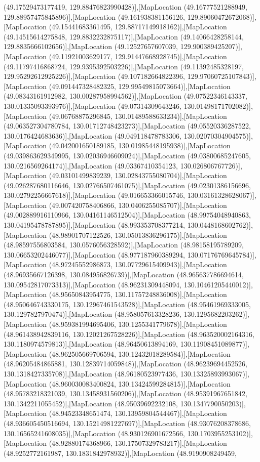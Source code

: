 (49.17529473177419, 129.88476823990428)],[MapLocation (49.16777521288949, 129.88957475845896)],[MapLocation (49.161938381156126, 129.89060472672068)],[MapLocation (49.15441683361495, 129.88717149918162)],[MapLocation (49.14515614275848, 129.8832232875117)],[MapLocation (49.14066428258144, 129.8835666102656)],[MapLocation (49.12527657607039, 129.900389425207)],[MapLocation (49.11921003629177, 129.91447668928745)],[MapLocation (49.11797416868724, 129.9395392503226)],[MapLocation (49.11392485328197, 129.95292612925226)],[MapLocation (49.107182664822396, 129.97060725107843)],[MapLocation (49.091447328482325, 129.99549815073664)],[MapLocation (49.08343161912982, 130.00287958994562)],[MapLocation (49.07522346143337, 130.01335093393976)],[MapLocation (49.07314309643246, 130.01498171702082)],[MapLocation (49.06768875296845, 130.01489588633234)],[MapLocation (49.063527304780784, 130.01712748423273)],[MapLocation (49.05520336287522, 130.0176424683636)],[MapLocation (49.049118478783306, 130.02070304904575)],[MapLocation (49.042001650189185, 130.01985448195938)],[MapLocation (49.039863629349995, 130.02036946609024)],[MapLocation (49.03800685247605, 130.0216569264174)],[MapLocation (49.03367410354123, 130.026806767726)],[MapLocation (49.03101499839239, 130.02843755080704)],[MapLocation (49.026287680116646, 130.02766507461075)],[MapLocation (49.02301386156696, 130.02792256667618)],[MapLocation (49.016653366015746, 130.03161328628067)],[MapLocation (49.007420758406866, 130.0406255085707)],[MapLocation (49.002889916110966, 130.04161146512504)],[MapLocation (48.99754048940863, 130.04195478787895)],[MapLocation (48.993353708377214, 130.0448168602762)],[MapLocation (48.98901707122526, 130.05013836296175)],[MapLocation (48.98597556803584, 130.0576056328592)],[MapLocation (48.98158195789209, 130.06653202446077)],[MapLocation (48.977187960389294, 130.07176769645784)],[MapLocation (48.97245552986873, 130.07729615409943)],[MapLocation (48.96935667126398, 130.084956826739)],[MapLocation (48.965637786694614, 130.09542817073313)],[MapLocation (48.96231309448094, 130.10461205440012)],[MapLocation (48.95650843954775, 130.11757248836008)],[MapLocation (48.950646743330175, 130.12967461543528)],[MapLocation (48.95461969333005, 130.1297827970474)],[MapLocation (48.958057613328236, 130.1295682203262)],[MapLocation (48.959381994695406, 130.1255341779678)],[MapLocation (48.961438942839116, 130.12021267528226)],[MapLocation (48.963520002164316, 130.1180974579813)],[MapLocation (48.96450613894169, 130.11908451089877)],[MapLocation (48.962505669706594, 130.12432018289584)],[MapLocation (48.96205484865881, 130.12839714059848)],[MapLocation (48.96239694452526, 130.1318427335708)],[MapLocation (48.96180523977436, 130.13325893993067)],[MapLocation (48.960030083400824, 130.13424599284815)],[MapLocation (48.95783218321039, 130.13458931560206)],[MapLocation (48.95391967651842, 130.1342211055452)],[MapLocation (48.95039692232108, 130.1347790050203)],[MapLocation (48.94523348651474, 130.13959804544467)],[MapLocation (48.936605450516694, 130.15214981227697)],[MapLocation (48.93076208378686, 130.16565241608035)],[MapLocation (48.930126901672566, 130.1703955253102)],[MapLocation (48.92880174368966, 130.17507329783217)],[MapLocation (48.9252772161987, 130.1831842978932)],[MapLocation (48.9190908249459, 